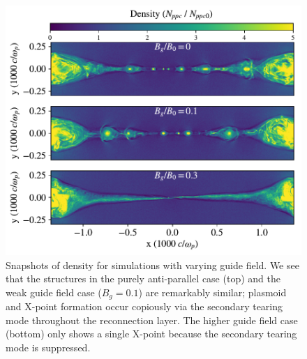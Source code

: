 \begin{figure}[htp] 
	\includegraphics[width=\linewidth]{diffguide_flds.pdf}
	\caption{Snapshots of density for simulations with varying guide field.  We see that the structures in the purely anti-parallel case (top) and the weak guide field case ($B_{g}=0.1$) are remarkably similar; plasmoid and X-point formation occur copiously via the secondary tearing mode throughout the reconnection layer.  The higher guide field case (bottom) only shows a single X-point because the secondary tearing mode is suppressed.}
	\label{bg_flds_compare}
\end{figure}

